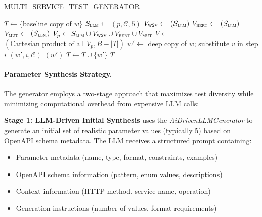 \documentclass[conference]{IEEEtran}
\begin{document}
\begin{algorithm}[tb]
\caption{MULTI\_SERVICE\_TEST\_GENERATOR}\label{alg:generate}
\footnotesize
\begin{algorithmic}[1]
\Require{}
\Ensure{}
\State $T \gets \{$baseline copy of $w$$\}$
        \State $S_{\textsc{llm}} \gets$ $(p, \mathcal{C}, 5)$ 
        \State $V_{\textsc{w2v}} \gets$ $(S_{\textsc{llm}})$
        \State $V_{\textsc{bert}} \gets$ $(S_{\textsc{llm}})$
        \State $V_{\textsc{mut}} \gets$ $(S_{\textsc{llm}})$
        \State $V_p \gets S_{\textsc{llm}} \cup V_{\textsc{w2v}} \cup V_{\textsc{bert}} \cup V_{\textsc{mut}}$
    \EndFor
    \State $V \gets$ $(\text{Cartesian product of all } V_p, B-|T|)$
        \State $w' \gets$ deep copy of $w$; substitute $v$ in step $i$
        \State {}$(w', i, \mathcal{C})$
        \State {}$(w')$
        \State $T \gets T \cup \{w'\}$
    \EndFor
\EndFor
\State \Return $T$
\end{algorithmic}
\end{algorithm}

\paragraph{Parameter Synthesis Strategy.}
The generator employs a two-stage approach that maximizes test diversity
while minimizing computational overhead from expensive LLM calls:

\textbf{Stage 1: LLM-Driven Initial Synthesis} uses the
\emph{AiDrivenLLMGenerator} to generate an initial set of realistic
parameter values (typically 5) based on OpenAPI schema metadata.  The LLM
receives a structured prompt containing:
\begin{itemize}[leftmargin=*]
  \item Parameter metadata (name, type, format, constraints, examples)
  \item OpenAPI schema information (pattern, enum values, descriptions)
  \item Context information (HTTP method, service name, operation)
  \item Generation instructions (number of values, format requirements)
\end{itemize}
\end{document}

